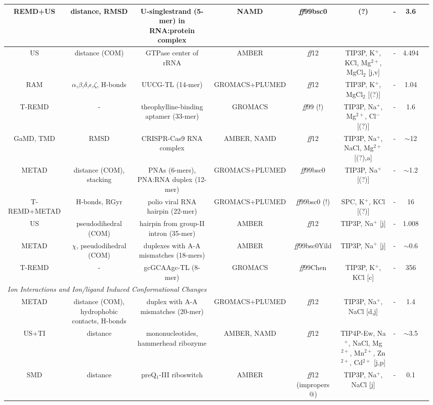 \begin{tabular}{ccccccccc}
\midrule 
REMD+US & distance, RMSD & U-singlestrand (5-mer) in RNA:protein complex & NAMD & \emph{ff}99bsc0 & (?) & - & 3.6 & \cite{vukovic2016molecular}\tabularnewline
\midrule 
US & distance (COM) & GTPase center of rRNA & AMBER & \emph{ff}12 & TIP3P, K$^{+}$, KCl, Mg$^{2+}$, MgCl$_{2}$ {[}j,v{]} & - & 4.494 & \cite{hayatshahi2017investigating}\tabularnewline
\midrule
RAM & $\alpha$,$\beta$,$\delta$,$\epsilon$,$\zeta$, H-bonds  & UUCG-TL (14-mer) & GROMACS+PLUMED & \emph{ff}12 & TIP3P, K$^{+}$, MgCl$_{2}$ {[}(?){]} & - & 1.04 & \cite{borkar2017simultaneous}\tabularnewline
\midrule
T-REMD & - & theophylline-binding aptamer (33-mer) & GROMACS & \emph{ff}99 (!) & TIP3P, Na$^{+}$, Mg$^{2+}$, Cl$^{-}$ {[}(?){]} & - & 1.6 & \cite{warfield2017molecular}\tabularnewline
\midrule 
GaMD, TMD & RMSD & CRISPR-Cas9 RNA complex & AMBER, NAMD & \emph{ff}12 & TIP3P, Na$^{+}$, NaCl, Mg$^{2+}$ {[}(?),a{]} & - & $\sim$12 & \cite{palermo2017crispr}\tabularnewline
\midrule
METAD & distance (COM), stacking & PNAs (6-mers), PNA:RNA duplex (12-mer) & GROMACS+PLUMED & \emph{ff}99bsc0 & TIP3P, Na$^{+}$ {[}(?){]} & - & $\sim$1.2 & \cite{verona2017focus}\tabularnewline
\midrule
T-REMD+METAD & H-bonds, RGyr & polio viral RNA hairpin (22-mer) & GROMACS+PLUMED & \emph{ff}99bsc0 (!) & SPC, K$^{+}$, KCl {[}(?){]} & - & 16 & \cite{pathak2017water}\tabularnewline
\midrule
US & pseudodihedral (COM) & hairpin from group-II intron (35-mer) & AMBER & \emph{ff}12 & TIP3P, Na$^{+}$ {[}j{]} & - & 1.008 & \cite{sun2017protonation}\tabularnewline
\midrule 
METAD & $\chi$, pseudodihedral (COM) & duplexes with A-A mismatches (18-mers) & AMBER & \emph{ff}99bsc0Yild & TIP3P, Na$^{+}$ {[}j{]} & - & $\sim$0.6 & \cite{pan2017structure}\tabularnewline
\midrule
T-REMD & - & gcGCAAgc-TL (8-mer) & GROMACS & \emph{ff}99Chen & TIP3P, K$^{+}$, KCl {[}c{]} & - & 356 & \cite{miner2017equilibrium}\tabularnewline
\midrule
\multicolumn{9}{l}{\emph{Ion Interactions and Ion/ligand Induced Conformational Changes}}\tabularnewline
\midrule 
METAD & distance (COM), hydrophobic contacts, H-bonds & duplex with A-A mismatches (20-mer)  & GROMACS+PLUMED & \emph{ff}12 & TIP3P, Na$^{+}$, NaCl {[}d,j{]} & - & 1.4 & \cite{bochicchio2015molecular}\tabularnewline
\midrule
US+TI & distance & mononucleotides, hammerhead ribozyme & AMBER, NAMD & \emph{ff}12 & TIP4P-Ew, Na$^{+}$, NaCl, Mg$^{2+}$, Mn$^{2+}$, Zn$^{2+}$, Cd$^{2+}$ {[}j,p{]} & - & $\sim$3.5 & \cite{panteva2015force}\tabularnewline
\midrule 
SMD & distance & preQ$_{1}$-III riboswitch & AMBER & \emph{ff}12 (impropers @) & TIP3P, Na$^{+}$, NaCl {[}j{]} & - & 0.1 & \cite{liberman2015structural}\tabularnewline

\end{tabular}
